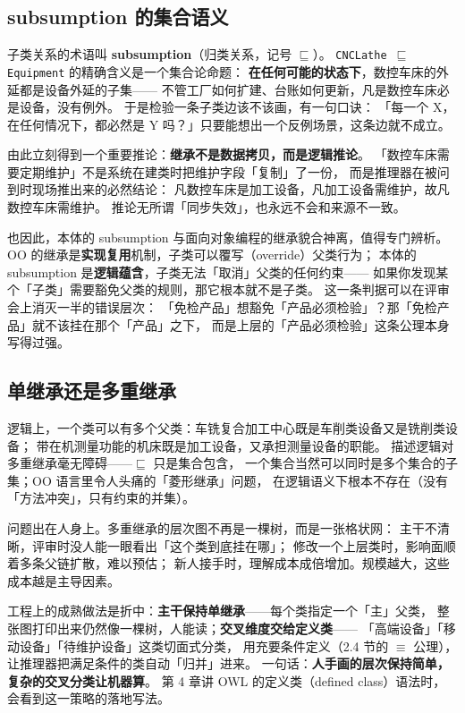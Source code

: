 \subsection{subsumption 的集合语义}

子类关系的术语叫 \textbf{subsumption}（归类关系，记号 \(\sqsubseteq\)）。
\texttt{CNCLathe \(\sqsubseteq\) Equipment} 的精确含义是一个集合论命题：
\textbf{在任何可能的状态下}，数控车床的外延都是设备外延的子集——
不管工厂如何扩建、台账如何更新，凡是数控车床必是设备，没有例外。
于是检验一条子类边该不该画，有一句口诀：
「每一个 X，在任何情况下，都必然是 Y 吗？」只要能想出一个反例场景，这条边就不成立。

由此立刻得到一个重要推论：\textbf{继承不是数据拷贝，而是逻辑推论}。
「数控车床需要定期维护」不是系统在建类时把维护字段「复制」了一份，
而是推理器在被问到时现场推出来的必然结论：
凡数控车床是加工设备，凡加工设备需维护，故凡数控车床需维护。
推论无所谓「同步失效」，也永远不会和来源不一致。

也因此，本体的 subsumption 与面向对象编程的继承貌合神离，值得专门辨析。
OO 的继承是\textbf{实现复用}机制，子类可以覆写（override）父类行为；
本体的 subsumption 是\textbf{逻辑蕴含}，子类无法「取消」父类的任何约束——
如果你发现某个「子类」需要豁免父类的规则，那它根本就不是子类。
这一条判据可以在评审会上消灭一半的错误层次：
「免检产品」想豁免「产品必须检验」？那「免检产品」就不该挂在那个「产品」之下，
而是上层的「产品必须检验」这条公理本身写得过强。

\subsection{单继承还是多重继承}

逻辑上，一个类可以有多个父类：车铣复合加工中心既是车削类设备又是铣削类设备；
带在机测量功能的机床既是加工设备，又承担测量设备的职能。
描述逻辑对多重继承毫无障碍——\(\sqsubseteq\) 只是集合包含，
一个集合当然可以同时是多个集合的子集；OO 语言里令人头痛的「菱形继承」问题，
在逻辑语义下根本不存在（没有「方法冲突」，只有约束的并集）。

问题出在人身上。多重继承的层次图不再是一棵树，而是一张格状网：
主干不清晰，评审时没人能一眼看出「这个类到底挂在哪」；
修改一个上层类时，影响面顺着多条父链扩散，难以预估；
新人接手时，理解成本成倍增加。规模越大，这些成本越是主导因素。

工程上的成熟做法是折中：\textbf{主干保持单继承}——每个类指定一个「主」父类，
整张图打印出来仍然像一棵树，人能读；\textbf{交叉维度交给定义类}——
「高端设备」「移动设备」「待维护设备」这类切面式分类，
用充要条件定义（2.4 节的 \(\equiv\) 公理），让推理器把满足条件的类自动「归并」进来。
一句话：\textbf{人手画的层次保持简单，复杂的交叉分类让机器算}。
第 4 章讲 OWL 的定义类（defined class）语法时，会看到这一策略的落地写法。


